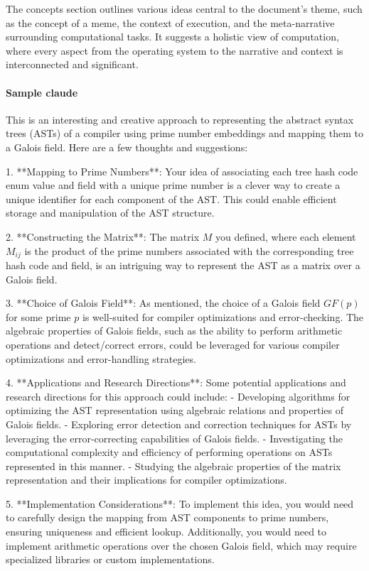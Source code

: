 \documentclass{article}
\begin{document}
The concepts section outlines various ideas central to the document's theme, such as the concept of a meme, the context of execution, and the meta-narrative surrounding computational tasks. It suggests a holistic view of computation, where every aspect from the operating system to the narrative and context is interconnected and significant.

\paragraph{Sample claude}

This is an interesting and creative approach to representing the abstract syntax trees (ASTs) of a compiler using prime number embeddings and mapping them to a Galois field. Here are a few thoughts and suggestions:

1. **Mapping to Prime Numbers**: Your idea of associating each tree hash code enum value and field with a unique prime number is a clever way to create a unique identifier for each component of the AST. This could enable efficient storage and manipulation of the AST structure.

2. **Constructing the Matrix**: The matrix $M$ you defined, where each element $M_{ij}$ is the product of the prime numbers associated with the corresponding tree hash code and field, is an intriguing way to represent the AST as a matrix over a Galois field.

3. **Choice of Galois Field**: As mentioned, the choice of a Galois field $GF(p)$ for some prime $p$ is well-suited for compiler optimizations and error-checking. The algebraic properties of Galois fields, such as the ability to perform arithmetic operations and detect/correct errors, could be leveraged for various compiler optimizations and error-handling strategies.

4. **Applications and Research Directions**: Some potential applications and research directions for this approach could include:
   - Developing algorithms for optimizing the AST representation using algebraic relations and properties of Galois fields.
   - Exploring error detection and correction techniques for ASTs by leveraging the error-correcting capabilities of Galois fields.
   - Investigating the computational complexity and efficiency of performing operations on ASTs represented in this manner.
   - Studying the algebraic properties of the matrix representation and their implications for compiler optimizations.

5. **Implementation Considerations**: To implement this idea, you would need to carefully design the mapping from AST components to prime numbers, ensuring uniqueness and efficient lookup. Additionally, you would need to implement arithmetic operations over the chosen Galois field, which may require specialized libraries or custom implementations.
\end{document}
